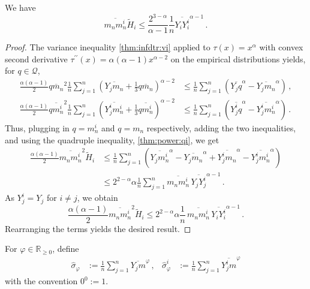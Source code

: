 \documentclass{article}
\newcommand*{\mc}[1]{\mathcal{#1}}
\newcommand{\R}{\mathbb{R}}
\newcommand{\Rp}{\R_{\geq0}}
\newcommand{\lb}{\left(} %
\newcommand{\rb}{\right)} %
\newcommand{\br}[1]{\lb #1 \rb} %
\newcommand{\prr}{^{\prime\prime}}
\newcommand{\eqcm}{\,,} %
\newcommand{\eqfs}{\,.}
\newcommand{\ol}[2]{\overline{#1#2}}
\newcommand{\tran}{\tau}
\newcommand{\ddtran}{\tau\prr}
\begin{document}
%
\begin{lemma}\label{lmm:power:mnmnibound}
    We have
    \begin{equation}
        \ol {m_n}{m_n^i} \tilde H_i \leq \frac{2^{3-\alpha}}{\alpha-1}\frac1n \ol {Y_i}{Y_i^i}^{\alpha-1}
        \eqfs
    \end{equation}
\end{lemma}
%
\begin{proof}
    The variance inequality \cref{thm:infdtr:vi} applied to $\tran(x)=x^\alpha$ with convex second derivative $\ddtran(x) = \alpha(\alpha-1)x^{\alpha-2}$ on the empirical distributions yields, for $q\in\mc Q$,
    \begin{align}
        \frac{\alpha(\alpha-1)}2 \ol q{m_n}^2 \frac1n \sum_{j=1}^n \br{\ol {Y_j}{m_n} + \frac13\ol q{m_n}}^{\alpha-2}
        &\leq
        \frac1n \sum_{j=1}^n \br{\ol {Y_j}q^{\alpha}-\ol {Y_j}{m_n}^{\alpha}} 
        \eqcm
        \\
        \frac{\alpha(\alpha-1)}2 \ol q{m_n^i}^2 \frac1n \sum_{j=1}^n \br{\ol {Y_j^i}{m_n^i} + \frac13\ol q{m_n^i}}^{\alpha-2}
        &\leq
        \frac1n \sum_{j=1}^n \br{\ol {Y_j^i}q^{\alpha}-\ol {Y_j^i}{m_n^i}^{\alpha}} 
        \eqfs
    \end{align}
    Thus, plugging in $q = m_n^i$ and $q = m_n$ respectively, adding the two inequalities, and using the quadruple inequality, \cref{thm:power:qi}, we get
    \begin{align}
        \frac{\alpha(\alpha-1)}2 \ol {m_n}{m_n^i}^2 \tilde H_i 
        &\leq 
        \frac1n \sum_{j=1}^n \br{
            \ol {Y_j}{m_n^i}^{\alpha} -
            \ol {Y_j}{m_n}^{\alpha} +
            \ol {Y_j^i}{m_n}^{\alpha} -
            \ol {Y_j^i}{m_n^i}^{\alpha}
        }  
        \\&\leq
        2^{2-\alpha}\alpha
        \frac1n \sum_{j=1}^n
        \ol {m_n}{m_n^i}
        \,
        \ol {Y_j}{Y_j^i}^{\alpha-1}
        \eqfs
    \end{align}
    As $Y_j^i = Y_j$ for $i\neq j$, we obtain
    \begin{equation}
        \frac{\alpha(\alpha-1)}2 \ol {m_n}{m_n^i}^2 \tilde H_i 
        \leq
        2^{2-\alpha}\alpha
        \frac1n \,
        \ol {m_n}{m_n^i}\,
        \ol {Y_i}{Y_i^i}^{\alpha-1}
        \eqfs
    \end{equation}
    Rearranging the terms yields the desired result.
\end{proof}
%
%
\begin{notation}\label{def:power:moments:empirical}
	For $\varphi\in\Rp$, define
	\begin{align}
		\hat \sigma_{\varphi} &:= \frac1n\sum_{j=1}^n\ol {Y_j}m^\varphi\eqcm
		&
		\hat \sigma_{\varphi}^i &:= \frac1n\sum_{j=1}^n\ol {Y_j^i}m^\varphi
	\end{align}
	with the convention $0^0:= 1$.
\end{notation}
\end{document}

